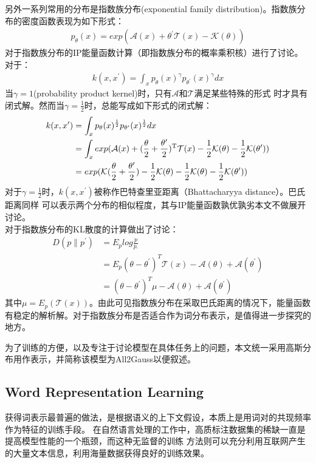 \documentclass[13pt]{article}
\begin{document}
另外一系列常用的分布是指数族分布(exponential family distribution)。指数族分布的密度函数表现为如下形式：
\begin{align*}
p_{\theta}(x)=exp(\mathcal{A}(x)+\theta^{\prime{}}\mathcal{T}(x)-\mathcal{K}(\theta))
\end{align*}
\cite{jebara2004probability}对于指数族分布的IP能量函数计算（即指数族分布的概率乘积核）进行了讨论。对于：
\begin{align*}
k(x,x^{\prime{}})=\int_x p_\theta(x)^{\gamma} p_{\theta^{\prime{}}}(x)^{\gamma}dx
\end{align*}
当$\gamma=1$(probability product kernel)时，只有$\mathcal{A}$和$\mathcal{T}$满足某些特殊的形式
时才具有闭式解。然而当$\gamma=\frac{1}{2}$时，总能写成如下形式的闭式解：
\begin{align*}
k(x,x^{\prime{}})&=\int_x p_\theta(x)^{\frac{1}{2}} p_{\theta^{\prime{}}}(x)^{\frac{1}{2}}dx \\
&=\int_x exp(\mathcal{A}(x)+(\frac{\theta}{2}+\frac{\theta^{\prime{}}}{2})^{\rm T}\mathcal{T}(x)-\frac{1}{2}\mathcal{K}(\theta)-\frac{1}{2}\mathcal{K}(\theta^{\prime{}})) \\
&=exp(\mathcal{K}(\frac{\theta}{2}+\frac{\theta^{\prime{}}}{2})-\frac{1}{2}\mathcal{K}(\theta)-\frac{1}{2}\mathcal{K}(\theta)-\frac{1}{2}\mathcal{K}(\theta^{\prime{}})) 
\end{align*}
对于$\gamma=\frac{1}{2}$时，$k(x,x^{\prime{}})$被称作巴特查里亚距离（Bhattacharyya distance）。巴氏距离同样
可以表示两个分布的相似程度，其与IP能量函数孰优孰劣本文不做展开讨论。\\

\cite{jordan2003introduction}对于指数族分布的KL散度的计算做出了讨论：
\begin{align*}
D(p \parallel p^{\prime{}}) &= E_p log \frac{p}{p_{\prime{}}} \\
&=E_p (\theta - \theta^{\prime{}})^{T} \mathcal{T}(x) - \mathcal{A}(\theta) + \mathcal{A}(\theta^{\prime{}}) \\
&= (\theta - \theta^{\prime{}})^{T} \mu - \mathcal{A}(\theta) + \mathcal{A}(\theta^{\prime{}})
\end{align*}
其中$\mu = E_p (\mathcal{T}(x))$。由此可见指数族分布在采取巴氏距离的情况下，能量函数有稳定的解析解。对于指数族分布是否适合作为词分布表示，是值得进一步探究的地方。

为了训练的方便，以及专注于讨论模型在具体任务上的问题，本文统一采用高斯分布用作表示，并简称该模型为All2Gauss以便叙述。

\subsection{Word Representation Learning}
获得词表示最普遍的做法，是根据语义的上下文假设，本质上是用词对的共现频率作为特征的训练手段。
在自然语言处理的工作中，高质标注数据集的稀缺一直是提高模型性能的一个瓶颈，而这种无监督的训练
方法则可以充分利用互联网产生的大量文本信息，利用海量数据获得良好的训练效果。
\end{document}
